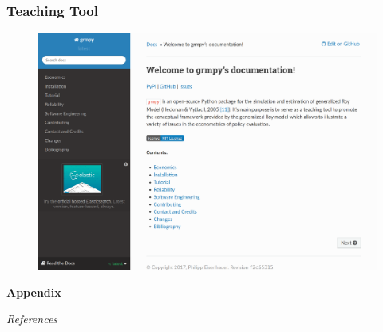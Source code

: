 \begin{frame}
\frametitle{Teaching Tool}
\begin{figure}[htp]\centering
	\includegraphics[width=\textwidth]{.././material/fig-online-documentation.png}
\end{figure}
\end{frame}


    

\beginbackup
\appendix
\begin{frame}\begin{center}
\LARGE\textbf{Appendix}
\end{center}\end{frame}

\begin{frame}\begin{center}
\LARGE\textit{References}
\end{center}\end{frame}
\begin{frame}[allowframebreaks]\frametitle{}

\nocite{Abbring.2007, Carneiro.2003, Carneiro.2011, Heckman.2001g, Heckman.2008a, Heckman.1997, Heckman.2006d, Heckman.2001d, Heckman.2001e, Heckman.2005e, Heckman.2007e, Heckman.2007f, Roy.1951}



%

\end{frame}


\backupend

